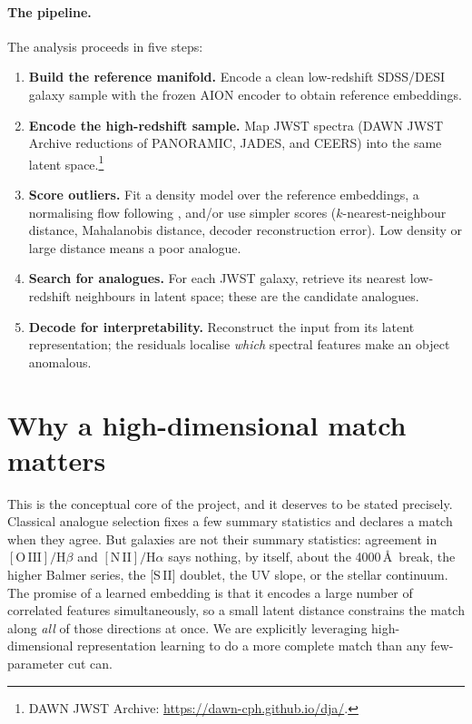 \documentclass[onecolumn,astrosymb,tighten,longbib,trackchanges]{aastex7} %
\newcommand{\aion}{\textsc{AION}\xspace}
\begin{document}
\paragraph{The pipeline.} The analysis proceeds in five steps:
\begin{enumerate}
  \item \textbf{Build the reference manifold.} Encode a clean low-redshift SDSS/DESI galaxy sample
        with the frozen \aion encoder to obtain reference embeddings.
  \item \textbf{Encode the high-redshift sample.} Map JWST spectra (DAWN JWST Archive reductions of
        PANORAMIC, JADES, and CEERS) into the same latent space.\footnote{DAWN JWST Archive: \url{https://dawn-cph.github.io/dja/}.}
  \item \textbf{Score outliers.} Fit a density model over the reference embeddings, a normalising
        flow following \citet{Liang2023_outlier_detection}, and/or use simpler scores
        ($k$-nearest-neighbour distance, Mahalanobis distance, decoder reconstruction error). Low
        density or large distance means a poor analogue.
  \item \textbf{Search for analogues.} For each JWST galaxy, retrieve its nearest low-redshift
        neighbours in latent space; these are the candidate analogues.
  \item \textbf{Decode for interpretability.} Reconstruct the input from its latent representation;
        the residuals localise \emph{which} spectral features make an object anomalous.
\end{enumerate}


\section{Why a high-dimensional match matters} \label{sec:highdim}

This is the conceptual core of the project, and it deserves to be stated precisely. Classical
analogue selection fixes a few summary statistics and declares a match when they agree. But galaxies
are not their summary statistics: agreement in $[\mathrm{O\,III}]/\mathrm{H}\beta$ and
$[\mathrm{N\,II}]/\mathrm{H}\alpha$ says nothing, by itself, about the 4000\,\AA\ break, the higher
Balmer series, the [S\,II] doublet, the UV slope, or the stellar continuum. The promise of a learned
embedding is that it encodes a large number of correlated features simultaneously, so a small latent
distance constrains the match along \emph{all} of those directions at once. We are explicitly
leveraging high-dimensional representation learning to do a more complete match than any
few-parameter cut can.
\end{document}
